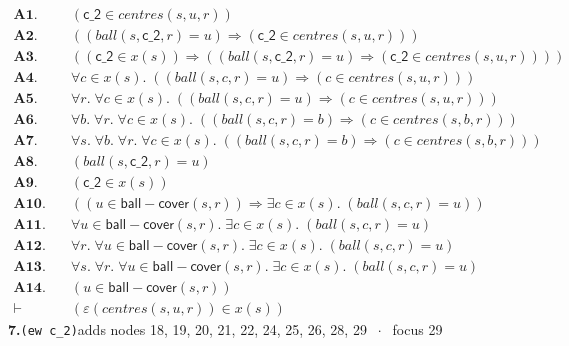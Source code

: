 \documentclass[11pt]{article}
\begin{document}
\begin{align*}
  \mathbf{A1.}\quad & (\mathsf{c\_2} \in \mathit{centres}(s, u, r)) \\
  \mathbf{A2.}\quad & ((\mathit{ball}(s, \mathsf{c\_2}, r) = u) \Rightarrow (\mathsf{c\_2} \in \mathit{centres}(s, u, r))) \\
  \mathbf{A3.}\quad & ((\mathsf{c\_2} \in x(s)) \Rightarrow ((\mathit{ball}(s, \mathsf{c\_2}, r) = u) \Rightarrow (\mathsf{c\_2} \in \mathit{centres}(s, u, r)))) \\
  \mathbf{A4.}\quad & \forall c \in x(s).\; ((\mathit{ball}(s, c, r) = u) \Rightarrow (c \in \mathit{centres}(s, u, r))) \\
  \mathbf{A5.}\quad & \forall r.\; \forall c \in x(s).\; ((\mathit{ball}(s, c, r) = u) \Rightarrow (c \in \mathit{centres}(s, u, r))) \\
  \mathbf{A6.}\quad & \forall b.\; \forall r.\; \forall c \in x(s).\; ((\mathit{ball}(s, c, r) = b) \Rightarrow (c \in \mathit{centres}(s, b, r))) \\
  \mathbf{A7.}\quad & \forall s.\; \forall b.\; \forall r.\; \forall c \in x(s).\; ((\mathit{ball}(s, c, r) = b) \Rightarrow (c \in \mathit{centres}(s, b, r))) \\
  \mathbf{A8.}\quad & (\mathit{ball}(s, \mathsf{c\_2}, r) = u) \\
  \mathbf{A9.}\quad & (\mathsf{c\_2} \in x(s)) \\
  \mathbf{A10.}\quad & ((u \in \mathsf{ball{-}cover}(s, r)) \Rightarrow \exists c \in x(s).\; (\mathit{ball}(s, c, r) = u)) \\
  \mathbf{A11.}\quad & \forall u \in \mathsf{ball{-}cover}(s, r).\; \exists c \in x(s).\; (\mathit{ball}(s, c, r) = u) \\
  \mathbf{A12.}\quad & \forall r.\; \forall u \in \mathsf{ball{-}cover}(s, r).\; \exists c \in x(s).\; (\mathit{ball}(s, c, r) = u) \\
  \mathbf{A13.}\quad & \forall s.\; \forall r.\; \forall u \in \mathsf{ball{-}cover}(s, r).\; \exists c \in x(s).\; (\mathit{ball}(s, c, r) = u) \\
  \mathbf{A14.}\quad & (u \in \mathsf{ball{-}cover}(s, r)) \\
  \vdash\quad & (\varepsilon(\mathit{centres}(s, u, r)) \in x(s))
\end{align*}
\medskip\noindent\textbf{7.}\quad \texttt{(ew c\_2)}\hfill{\small adds nodes 18, 19, 20, 21, 22, 24, 25, 26, 28, 29 $\;\cdot\;$ focus 29}\\[2pt]
\end{document}
